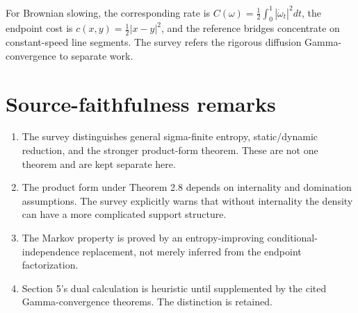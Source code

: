 For Brownian slowing, the corresponding rate is
\(C(\omega)=\tfrac12\int_0^1|\dot\omega_t|^2dt\), the endpoint cost is
\(c(x,y)=\tfrac12|x-y|^2\), and the reference bridges concentrate on constant-speed line segments.
The survey refers the rigorous diffusion Gamma-convergence to separate work.

\section{Source-faithfulness remarks}
\begin{enumerate}[leftmargin=2em]
\item The survey distinguishes general sigma-finite entropy, static/dynamic reduction, and the
stronger product-form theorem.  These are not one theorem and are kept separate here.
\item The product form under Theorem 2.8 depends on internality and domination assumptions.  The
survey explicitly warns that without internality the density can have a more complicated support
structure.
\item The Markov property is proved by an entropy-improving conditional-independence replacement,
not merely inferred from the endpoint factorization.
\item Section 5's dual calculation is heuristic until supplemented by the cited Gamma-convergence
theorems.  The distinction is retained.
\end{enumerate}



